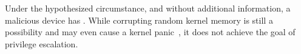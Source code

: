 Under the hypothesized circumstance, and without additional information, a malicious device has \DIFdelbegin {}\DIFdelend \DIFaddbegin {}\DIFaddend .
While corrupting random kernel memory is still a possibility and may even cause a kernel panic~\cite{MMT16}, it does not achieve the goal of privilege escalation.

